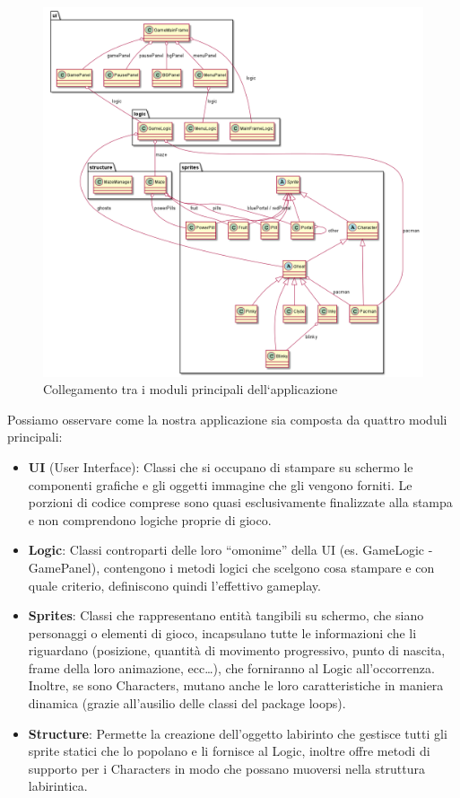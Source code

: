 \documentclass[12pt,a4paper]{report}
\begin{document}
\begin{figure}[bt]
  \centerline{\includegraphics[width=14cm]{jpacman-UML}}
\caption{Collegamento tra i moduli principali dell`applicazione}
  \label{fig:jpacman-UML}
\end{figure}

Possiamo osservare come la nostra applicazione sia composta da quattro moduli principali:
\begin{itemize}
 \item \textbf{UI} (User Interface): Classi che si occupano di stampare su schermo le componenti grafiche e gli oggetti immagine che gli vengono forniti. Le porzioni di codice comprese sono quasi esclusivamente finalizzate alla stampa e non comprendono logiche proprie di gioco.
 \item \textbf{Logic}: Classi controparti delle loro “omonime” della UI (es. GameLogic - GamePanel), contengono i metodi logici che scelgono cosa stampare e con quale criterio, definiscono quindi l’effettivo gameplay.
 \item \textbf{Sprites}: Classi che rappresentano entità tangibili su schermo, che siano personaggi o elementi di gioco, incapsulano tutte le informazioni che li riguardano (posizione, quantità di movimento progressivo, punto di nascita, frame della loro animazione, ecc…), che forniranno al Logic all’occorrenza. Inoltre, se sono Characters, mutano anche le loro caratteristiche in maniera dinamica (grazie all’ausilio delle classi del package loops).
 \item \textbf{Structure}: Permette la creazione dell’oggetto labirinto che gestisce tutti gli sprite statici che lo popolano e li fornisce al Logic, inoltre offre metodi di supporto per i Characters in modo che possano muoversi nella struttura labirintica.\newpage
\end{itemize}
\end{document}
